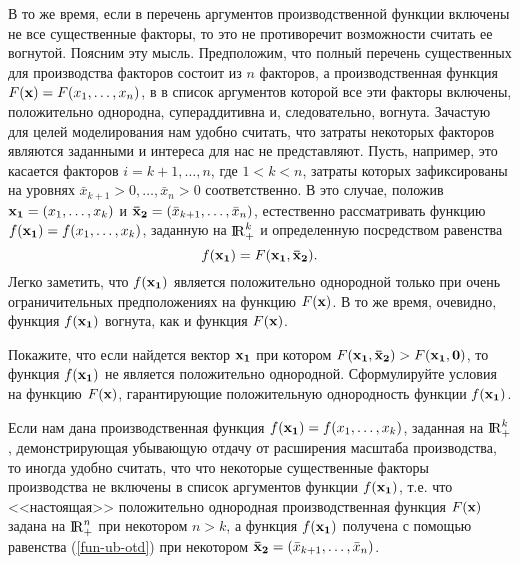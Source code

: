     В то же время, если в перечень аргументов производственной
    функции включены не все существенные факторы, то это не
    противоречит возможности считать ее вогнутой. Поясним эту мысль.
    Предположим, что полный перечень существенных для производства
    факторов состоит из $n$ факторов, а производственная функция
    $F(\mathbf{x})=F(x_{1},\ldots,x_{n})$, в в список аргументов которой все эти
    факторы включены, положительно однородна, супераддитивна и,
    следовательно, вогнута.
    Зачастую для целей моделирования нам удобно
    считать, что затраты некоторых факторов являются заданными и интереса для
    нас не представляют.  Пусть, например, это касается факторов
    $i=k+1,\ldots,n$, где $1<k<n$, затраты которых зафиксированы на
    уровнях $\bar{x}_{k+1}>0,\ldots,\bar{x}_{n}>0$ соответственно.
    В это случае, положив $\mathbf{x_{1}}=(x_{1},\ldots,x_{k})$ и
    $\mathbf{\bar{x}_{2}}=(\bar{x}_{k+1},\ldots,\bar{x}_{n})$,
    естественно рассматривать функцию
    $f(\mathbf{x_{1}})=f(x_{1},\ldots,x_{k})$, заданную на ${\rm I\!R}^{k}_{+}$
    и определенную посредством равенства
\begin{equation} \label{fun-ub-otd}
    f(\mathbf{x_{1}})=F(\mathbf{x_{1}},\mathbf{\bar{x}_{2}}).
\end{equation}
    Легко заметить, что $f(\mathbf{x_{1}})$ является
    положительно однородной только при очень ограничительных
    предположениях на функцию $F(\mathbf{x})$. В
    то же время, очевидно, функция $f(\mathbf{x_{1}})$ вогнута,
    как и функция $F(\mathbf{x})$.

\begin{exer}
    Покажите, что если найдется вектор $\mathbf{x_{1}}$ при
    котором
    $F(\mathbf{x_{1}},\mathbf{\bar{x}_{2}})
    >F(\mathbf{x_{1}},\mathbf{0})$,
    то функция $f(\mathbf{x_{1}})$ не является положительно
    однородной. Сформулируйте условия на функцию
    $F(\mathbf{x})$, гарантирующие положительную
    однородность функции $f(\mathbf{x_{1}})$.
\end{exer}

    Если нам дана
    производственная функция $f(\mathbf{x_{1}})=f(x_{1},\ldots,x_{k})$, заданная на
    ${\rm I\!R}_{+}^{k}$,
     демонстрирующая убывающую отдачу от расширения масштаба
    производства, то иногда удобно считать, что
    что некоторые существенные факторы производства не включены в
    список аргументов функции $f(\mathbf{x_{1}})$, т.е. что
    <<настоящая>> положительно однородная
    производственная функция $F(\mathbf{x})$ задана на ${\rm I\!R}_{+}^{n}$ при
    некотором $n>k$, а функция $f(\mathbf{x_{1}})$ получена с помощью
    равенства (\ref{fun-ub-otd}) при некотором
    $\mathbf{\bar{x}_{2}}=(\bar{x}_{k+1},\ldots,\bar{x}_{n})$.

